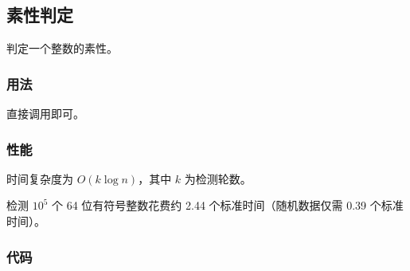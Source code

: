 \subsection{素性判定}

判定一个整数的素性。

\subsubsection{用法}

直接调用即可。

\subsubsection{性能}

时间复杂度为 $O(k \log n)$，其中 $k$ 为检测轮数。

检测 $10^5$ 个 64 位有符号整数花费约 2.44 个标准时间（随机数据仅需 0.39 个标准时间）。

\subsubsection{代码}


